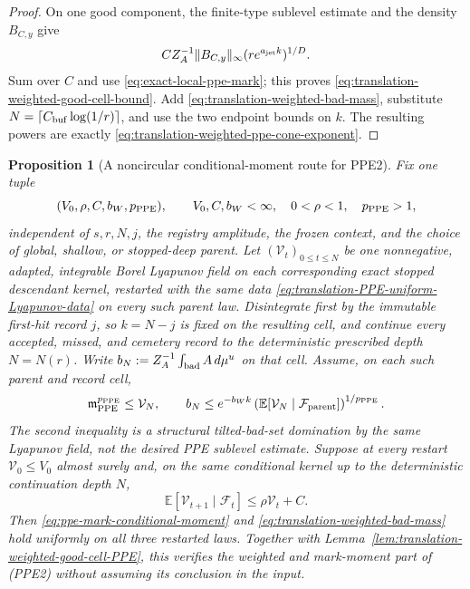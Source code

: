 \documentclass[11pt]{article}
\newtheorem{proposition}[theorem]{Proposition}
\begin{document}
\begin{proof}
On one good component, the finite-type sublevel estimate and the density
$B_{C,y}$ give
\[
 C Z_A^{-1}\|B_{C,y}\|_\infty
 (re^{a_{\rm jet}k})^{1/D}.
\]
Sum over $C$ and use
\eqref{eq:exact-local-ppe-mark}; this proves
\eqref{eq:translation-weighted-good-cell-bound}.  Add
\eqref{eq:translation-weighted-bad-mass}, substitute
$N=\lceil C_{\rm buf}\log(1/r)\rceil$, and use the two endpoint bounds on
$k$.  The resulting powers are exactly
\eqref{eq:translation-weighted-ppe-cone-exponent}.
\end{proof}

\begin{proposition}[A noncircular conditional-moment route for PPE2]
\label{prop:translation-PPE-Lyapunov-route}
Fix one tuple
\begin{equation}
\label{eq:translation-PPE-uniform-Lyapunov-data}
 (V_0,\rho,C,b_W,p_{\rm PPE}),
 \qquad V_0,C,b_W<\infty,\quad 0<\rho<1,
 \quad p_{\rm PPE}>1,
\end{equation}
independent of $s,r,N,j$, the registry amplitude, the frozen context, and
the choice of global, shallow, or stopped-deep parent.  Let
$(\mathcal V_t)_{0\le t\le N}$ be one nonnegative, adapted, integrable Borel
Lyapunov field on each corresponding exact stopped descendant kernel,
restarted with the same data \eqref{eq:translation-PPE-uniform-Lyapunov-data}
on every such parent law.
Disintegrate first by the immutable first-hit record $j$, so $k=N-j$ is
fixed on the resulting cell, and continue every accepted, missed, and
cemetery record to the deterministic prescribed depth $N=N(r)$.  Write
$b_N:=Z_A^{-1}\int_{\rm bad}A\,d\mu^u$ on that cell.  Assume, on each such
parent and record cell,
\begin{equation}
\label{eq:translation-PPE-Lyapunov-domination}
 \mathfrak m_{\rm PPE}^{p_{\rm PPE}}\le\mathcal V_N,
 \qquad
 b_N\le e^{-b_Wk}
 \left(\mathbb E[\mathcal V_N\mid\mathcal F_{\rm parent}]
 \right)^{1/p_{\rm PPE}}.
\end{equation}
The second inequality is a structural tilted-bad-set domination by the same
Lyapunov field, not the desired PPE sublevel estimate.  Suppose at every
restart $\mathcal V_0\le V_0$ almost surely and, on the same conditional
kernel up to the deterministic continuation depth $N$,
\begin{equation}
\label{eq:translation-PPE-Lyapunov-drift}
 \mathbb E[\mathcal V_{t+1}\mid\mathcal F_t]
 \le\rho\mathcal V_t+C.
\end{equation}
Then \eqref{eq:ppe-mark-conditional-moment} and
\eqref{eq:translation-weighted-bad-mass} hold uniformly on all three
restarted laws.  Together with
Lemma~\ref{lem:translation-weighted-good-cell-PPE}, this verifies the
weighted and mark-moment part of \textup{(PPE2)} without assuming its
conclusion in the input.
\end{proposition}
\end{document}
